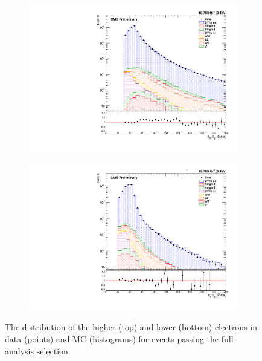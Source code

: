 \begin{figure}[tb]
    \centering
    \begin{subfigure}[b]{0.65\textwidth}
        \includegraphics[width=\textwidth]{figures/e0_pt.pdf}
        \caption{}
        \label{fig:e_pt_high}
    \end{subfigure}
    \begin{subfigure}[b]{0.65\textwidth}
        \includegraphics[width=\textwidth]{figures/e1_pt.pdf}
        \caption{}
        \label{fig:e_pt_low}
    \end{subfigure}
    \caption{
        The \pt distribution of the higher (top) and lower (bottom) \pt
        electrons in data (points) and MC (histograms) for events passing the
        full analysis selection.
    }
    \label{fig:e_pt}
\end{figure}

